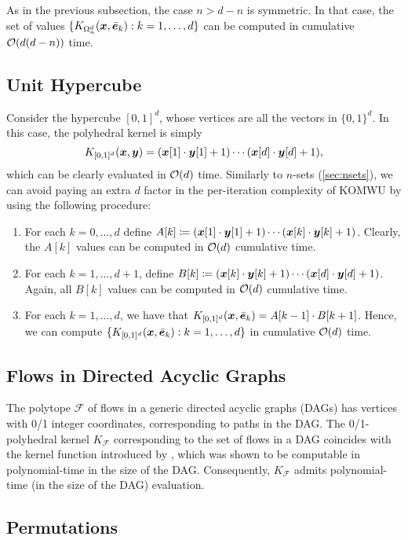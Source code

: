 As in the previous subsection, the case $n > d-n$ is symmetric. In that case, the set of values $\{K_{{\Omega^d_n}}(\bm{x},\bar{\bm{e}}_k): k =1,\dots,d\}$ can be computed in cumulative $\mathcal{O}(d(d-n))$ time.

\subsection{Unit Hypercube}

Consider the hypercube $[0,1]^d$, whose vertices are all the vectors in $\{0,1\}^d$. In this case, the polyhedral kernel is simply
\[
    K_{[0,1]^d}(\bm{x},\bm{y}) = (\bm{x}[1]\cdot \bm{y}[1] + 1) \cdots (\bm{x}[d]\cdot \bm{y}[d] + 1),
\]
which can be clearly evaluated in $\mathcal{O}(d)$ time. Similarly to $n$-sets (\cref{sec:nsets}), we can avoid paying an extra $d$ factor in the per-iteration complexity of KOMWU by using the following procedure:
\begin{enumerate}
    \item For each $k = 0,\dots,d$ define $A[k] \coloneqq (\bm{x}[1]\cdot \bm{y}[1] + 1) \cdots (\bm{x}[k] \cdot \bm{y}[k] + 1)$. Clearly, the $A[k]$ values can be computed in $\mathcal{O}(d)$ cumulative time.
    \item For each $k = 1,\dots,d+1$, define $B[k] \coloneqq (\bm{x}[k]\cdot \bm{y}[k] + 1) \cdots (\bm{x}[d] \cdot \bm{y}[d] + 1)$. Again, all $B[k]$ values can be computed in $\mathcal{O}(d)$ cumulative time.
    \item For each $k=1,\dots,d$, we have that $K_{[0,1]^d}(\bm{x}, \bar{\bm{e}}_k) = A[k-1]\cdot B[k+1]$. Hence, we can compute $\{K_{[0,1]^d}(\bm{x},\bar{\bm{e}}_k): k=1,\dots,d\}$ in cumulative $\mathcal{O}(d)$ time.
\end{enumerate}

\subsection{Flows in Directed Acyclic Graphs}

The polytope $\mathcal{F}$ of flows in a generic directed acyclic graphs (DAGs) has vertices with 0/1 integer coordinates, corresponding to paths in the DAG. The 0/1-polyhedral kernel $K_{\mathcal{F}}$ corresponding to the set of flows in a DAG coincides with the kernel function introduced by \citet{Takimoto03:Path}, which was shown to be computable in polynomial-time in the size of the DAG. Consequently, $K_\mathcal{F}$ admits polynomial-time (in the size of the DAG) evaluation.


\subsection{Permutations}

